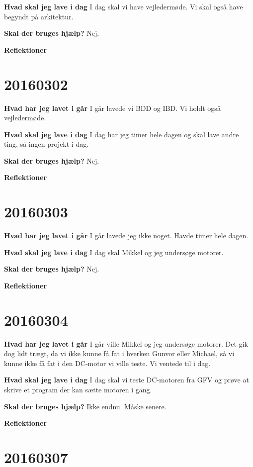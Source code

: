 \documentclass{article}
\begin{document}
	\textbf{Hvad skal jeg lave i dag}
	I dag skal vi have vejledermøde. Vi skal også have begyndt på arkitektur. 
	
	\textbf{Skal der bruges hjælp?}
	Nej. 
	
	\textbf{Reflektioner}

	\section{20160302}

	\textbf{Hvad har jeg lavet i går}
	I går lavede vi BDD og IBD. Vi holdt også vejledermøde. 
	
	\textbf{Hvad skal jeg lave i dag}
	I dag har jeg timer hele dagen og skal lave andre ting, så ingen projekt i dag. 
	
	\textbf{Skal der bruges hjælp?}
	Nej. 

	\textbf{Reflektioner}


	\section{20160303}
	
	\textbf{Hvad har jeg lavet i går}
	I går lavede jeg ikke noget. Havde timer hele dagen.  
	
	\textbf{Hvad skal jeg lave i dag}
	I dag skal Mikkel og jeg undersøge motorer.   
	
	\textbf{Skal der bruges hjælp?}
	Nej. 
	
	\textbf{Reflektioner}
	
	
	\section{20160304}
	
	\textbf{Hvad har jeg lavet i går}
	I går ville Mikkel og jeg undersøge motorer. Det gik dog lidt trægt, da vi ikke kunne få fat i hverken Gunvor eller Michael, så vi kunne ikke få fat i den DC-motor vi ville teste. Vi ventede til i dag. 
	
	\textbf{Hvad skal jeg lave i dag}
	I dag skal vi teste DC-motoren fra GFV og prøve at skrive et program der kan sætte motoren i gang. 
	
	\textbf{Skal der bruges hjælp?}
	Ikke endnu. Måske senere. 
	
	\textbf{Reflektioner}
	
	\section{20160307}
	
\end{document}
